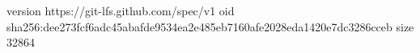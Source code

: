 version https://git-lfs.github.com/spec/v1
oid sha256:dee273fcf6adc45abafde9534ea2e485eb7160afe2028eda1420e7dc3286cceb
size 32864
